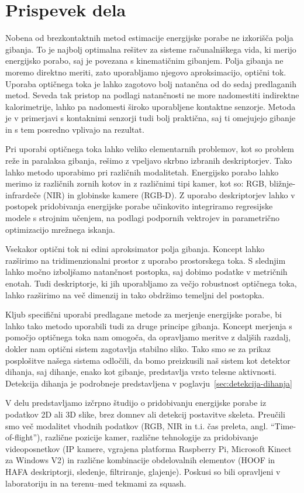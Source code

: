 \section{Prispevek dela}
Nobena od brezkontaktnih metod estimacije energijske porabe ne izkorišča polja gibanja. To je najbolj optimalna rešitev za sisteme računalniškega vida, ki merijo energijsko porabo, saj je povezana s kinematičnim gibanjem. Polja gibanja ne moremo direktno meriti, zato uporabljamo njegovo aproksimacijo, optični tok. Uporaba optičnega toka je lahko zagotovo bolj natančna od do sedaj predlaganih metod. Seveda tak pristop na podlagi natančnosti ne more nadomestiti indirektne kalorimetrije, lahko pa nadomesti široko uporabljene kontaktne senzorje. Metoda je v primerjavi s kontaknimi senzorji tudi bolj praktična, saj ti omejujejo gibanje in s tem posredno vplivajo na rezultat. 

Pri uporabi optičnega toka lahko veliko elementarnih problemov, kot so problem reže in paralaksa gibanja, rešimo z vpeljavo skrbno izbranih deskriptorjev. Tako lahko metodo uporabimo pri različnih modalitetah. Energijsko porabo lahko merimo iz različnih zornih kotov in z različnimi tipi kamer, kot so: RGB, bližnje-infrardeče (NIR) in globinske kamere (RGB-D). Z uporabo deskriptorjev lahko v postopek pridobivanja energijske porabe učinkovito integriramo regresijske modele s strojnim učenjem, na podlagi podpornih vektrojev in parametrično optimizacijo mrežnega iskanja. 

Vsekakor optični tok ni edini aproksimator polja gibanja. Koncept lahko razširimo na tridimenzionalni prostor z uporabo prostorskega toka. S slednjim lahko močno izboljšamo natančnost postopka, saj dobimo podatke v metričnih enotah. Tudi deskriptorje, ki jih uporabljamo za večjo robustnost optičnega toka, lahko razširimo na več dimenzij in tako obdržimo temeljni del postopka.

Kljub specifični uporabi predlagane metode za merjenje energijske porabe, bi lahko tako metodo uporabili tudi za druge principe gibanja. Koncept merjenja s pomočjo optičnega toka nam omogoča, da opravljamo meritve z daljših razdalj, dokler nam optični sistem zagotavlja stabilno sliko. Tako smo se za prikaz posplošitve našega sistema odločili, da bomo preizkusili naš sistem kot detektor dihanja, saj dihanje, enako kot gibanje, predstavlja vrsto telesne aktivnosti. Detekcija dihanja je podrobneje predstavljena v poglavju~\ref{sec:detekcija-dihanja}

V delu predstavljamo izčrpno študijo o pridobivanju energijske porabe iz podatkov 2D ali 3D slike, brez domnev ali detekcij postavitve skeleta. Preučili smo več modalitet vhodnih podatkov (RGB, NIR in t.i. čas preleta, angl. ``Time-of-flight''), različne pozicije kamer, različne tehnologije za pridobivanje videoposnetkov (IP kamere, vgrajena platforma Raspberry Pi, Microsoft Kinect za Windows V2) in različne kombinacije obdelovalnih elementov (HOOF in HAFA deskriptorji, sledenje, filtriranje, glajenje). Poskusi so bili opravljeni v laboratoriju in na terenu--med tekmami za squash.

